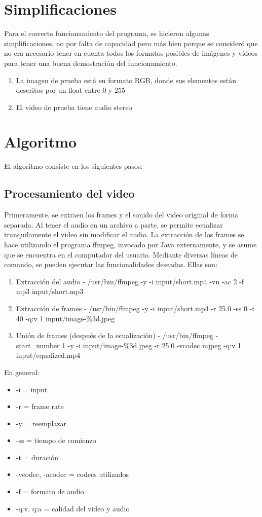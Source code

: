 \documentclass[12pt,spanish]{article}
\begin{document}
	\section{Simplificaciones}

	Para el correcto funcionamiento del programa, se hicieron algunas simplificaciones, no por falta de capacidad pero m\'as bien porque se consider\'o que no era necesario tener en cuenta todos los formatos posibles de im\'agenes y videos para tener una buena demostraci\'on del funcionamiento.
	\begin{enumerate}
	\item La imagen de prueba est\'a en formato RGB, donde sus elementos est\'an descritos por un float entre 0 y 255
	\item El video de prueba tiene audio stereo
	\end{enumerate}

	\section{Algoritmo}
	El algoritmo consiste en los siguientes pasos:
	\subsection{Procesamiento del video}
	Primeramente, se extraen los frames y el sonido del video original de forma separada. Al tener el audio en un archivo a parte, se permite ecualizar tranquilamente el video sin modificar el audio. La extracci\'on de los frames se hace utilizando el programa ffmpeg, invocado por Java externamente, y se asume que se encuentra en el computador del usuario. Mediante diversas l\'ineas de comando, se pueden ejecutar las funcionalidades deseadas. Ellas son:
	\begin{enumerate}
		\item Extracci\'on del audio - /usr/bin/ffmpeg -y -i input/short.mp4 -vn -ac 2 -f mp3 input/short.mp3
		\item Extracci\'on de frames - /usr/bin/ffmpeg -y -i input/short.mp4 -r 25.0 -ss 0 -t 40 -q:v 1 input/image-\%3d.jpeg
		\item Uni\'on de frames (despu\'es de la ecualizaci\'on) - /usr/bin/ffmpeg -start\_number 1 -y -i input/image-\%3d.jpeg -r 25.0 -vcodec mjpeg -q:v 1 input/equalized.mp4
	\end{enumerate}
	En general: 
	\begin{itemize}
		\item -i = input
		\item -r = frame rate
		\item -y = reemplazar
		\item -ss = tiempo de comienzo
		\item -t = duraci\'on
		\item -vcodec, -acodec = codecs utilizados
		\item -f = formato de audio
		\item -q:v, q:a = calidad del video y audio
	\end{itemize}
\end{document}
